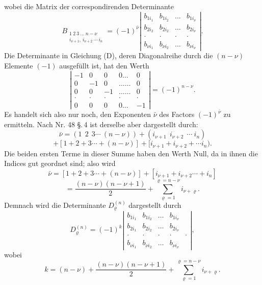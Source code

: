 
wobei die Matrix der correspondirenden Determinante
\[
B_{\substack{1\ 2\ 3\ \ldots\ n-\nu\\i_{\nu+1},\ i_{\nu+2}\ \cdots\ i_n}}
=(-1)^{\bar\nu}
\left|\begin{array}{cccc}
b_{1i_1} & b_{1i_2} & \ldots & b_{1i_\nu}\\
b_{2i_2} & b_{2i_2} & \ldots & b_{2i_\nu}\\
\cdot & \cdot & \cdot & \cdot\\
b_{\nu i_1} & b_{\nu i_2} & \ldots & b_{\nu i_\nu}
\end{array}\right|.
\]
Die Determinante in Gleichung (D), deren Diagonalreihe durch die $(n-\nu)$
Elemente $(-1)$ ausgef\"ullt ist, hat den Werth
\[
\left|\begin{array}{ccccc}
-1 & 0 & 0 & 0\ldots & 0\\
0 & -1 & 0 & \ldots\ldots & 0\\
0 & 0 & -1 & \ldots\ldots & 0\\
\cdot & \cdot & \cdot & \cdot & \cdot\\
0 & 0 & 0 & 0\ldots & -1
\end{array}\right|
=(-1)^{n-\nu}.
\]
Es handelt sich also nur noch, den Exponenten $\bar\nu$ des Factors
$(-1)^{\bar\nu}$ zu ermitteln. Nach Nr. 48 \S.\,4 ist derselbe aber dargestellt
durch:
\[
\bar\nu=(1\ \ 2\ \ 3\cdots\ (n-\nu))+(i_{\nu+1}\ \ i_{\nu+2}\ \ \cdots\ i_n)
\]
\[
+[1+2+3\cdots+(n-\nu)]+[i_{\nu+1}+i_{\nu+2}+\cdots i_n). %
\]
Die beiden ersten Terme in dieser Summe haben den Werth Null, da in ihnen
die Indices gut geordnet sind; also wird
\[
\bar\nu=[1+2+3\cdots+(n-\nu)]+[i_{\nu+1}+i_{\nu+2}\cdots+i_n]
\]
\[
=\frac{(n-\nu)(n-\nu+1)}{2}+\sum_{\varrho=1}^{\varrho=n-\nu}i_{\nu+\varrho}.
\]
Demnach wird die Determinante $D_\varrho^{(n)}$ dargestellt durch
\[
D_\varrho^{(n)}=(-1)^k
\left|\begin{array}{ccccc}
b_{1i_1} & b_{1i_2} & \ldots & b_{1i_\nu}\\
b_{2i_1} & b_{2i_2} & \ldots & b_{2i_\nu}\\
\cdot & \cdot & \cdot & \cdot & \cdot\\
b_{\nu i_1} & b_{\nu i_2} & \ldots & b_{\nu i_\nu}
\end{array}\right|,
\]
wobei
\[
k=(n-\nu)+\frac{(n-\nu)(n-\nu+1)}{2}+\sum_{\varrho=1}^{\varrho=n-\nu}i_{\nu+\varrho}. \tag{E}
\]

